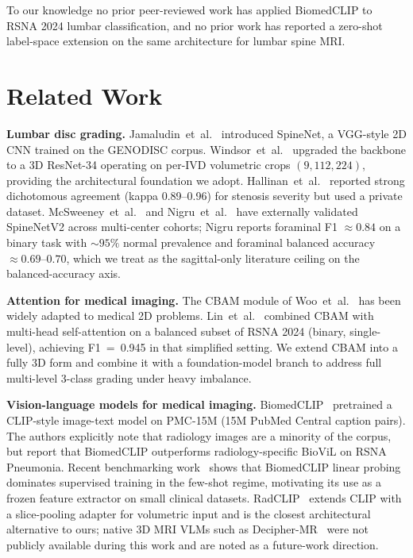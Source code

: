 \documentclass[conference]{IEEEtran}
\begin{document}
To our knowledge no prior peer-reviewed work has applied BiomedCLIP to
RSNA 2024 lumbar classification, and no prior work has reported a
zero-shot label-space extension on the same architecture for lumbar
spine MRI.

\section{Related Work}
\label{sec:related}

\textbf{Lumbar disc grading.}
Jamaludin~et~al.~\cite{jamaludin2017} introduced SpineNet, a VGG-style
2D CNN trained on the GENODISC corpus. Windsor~et~al.~\cite{windsor2022}
upgraded the backbone to a 3D ResNet-34 operating on per-IVD volumetric
crops $(9,112,224)$, providing the architectural foundation we adopt.
Hallinan~et~al.~\cite{hallinan2021} reported strong dichotomous
agreement (kappa 0.89--0.96) for stenosis severity but used a private
dataset. McSweeney~et~al.~\cite{mcsweeney2023} and Nigru~et~al.~\cite{nigru2024}
have externally validated SpineNetV2 across multi-center cohorts; Nigru
reports foraminal F1 $\approx 0.84$ on a binary task with $\sim 95\%$
normal prevalence and foraminal balanced accuracy $\approx 0.69$--$0.70$,
which we treat as the sagittal-only literature ceiling on the
balanced-accuracy axis.

\textbf{Attention for medical imaging.}
The CBAM module of Woo~et~al.~\cite{woo2018cbam} has been widely
adapted to medical 2D problems. Lin~et~al.~\cite{lin2024cbam} combined
CBAM with multi-head self-attention on a balanced subset of RSNA 2024
(binary, single-level), achieving F1~=~0.945 in that simplified
setting. We extend CBAM into a fully 3D form and combine it with a
foundation-model branch to address full multi-level 3-class grading
under heavy imbalance.

\textbf{Vision-language models for medical imaging.}
BiomedCLIP~\cite{zhang2023biomedclip} pretrained a CLIP-style
image-text model on PMC-15M (15M PubMed Central caption pairs). The
authors explicitly note that radiology images are a minority of the
corpus, but report that BiomedCLIP outperforms radiology-specific
BioViL on RSNA Pneumonia. Recent benchmarking work~\cite{datascarcity2024}
shows that BiomedCLIP linear probing dominates supervised training in
the few-shot regime, motivating its use as a frozen feature extractor on
small clinical datasets. RadCLIP~\cite{lu2024radclip} extends CLIP with
a slice-pooling adapter for volumetric input and is the closest
architectural alternative to ours; native 3D MRI VLMs such as
Decipher-MR~\cite{yang2026deciphermr} were not publicly available
during this work and are noted as a future-work direction.
\end{document}
